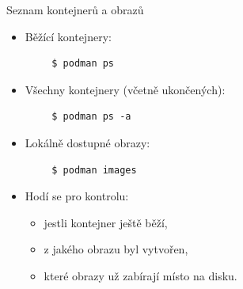 \documentclass{beamer}
\begin{document}
\begin{frame}[fragile]{Seznam kontejnerů a obrazů}
	\begin{itemize}
		\item Běžící kontejnery:
	\end{itemize}
	\begin{verbatim}
		$ podman ps
	\end{verbatim}
	
	\begin{itemize}
		\item Všechny kontejnery (včetně ukončených):
	\end{itemize}
	\begin{verbatim}
		$ podman ps -a
	\end{verbatim}
	
	\begin{itemize}
		\item Lokálně dostupné obrazy:
	\end{itemize}
	\begin{verbatim}
		$ podman images
	\end{verbatim}
	
	\begin{itemize}
		\item Hodí se pro kontrolu:
		\begin{itemize}
			\item jestli kontejner ještě běží,
			\item z jakého obrazu byl vytvořen,
			\item které obrazy už zabírají místo na disku.
		\end{itemize}
	\end{itemize}
\end{frame}
\end{document}
